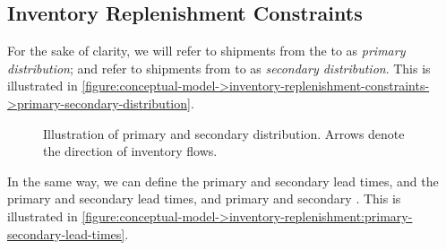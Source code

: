 \subsection{Inventory Replenishment Constraints}
\label{section:conceptual-model->inventory-replenishment-constraints}

For the sake of clarity,
we will refer to shipments
from the  to 
as \emph{primary distribution};
and refer to shipments
from  to 
as \emph{secondary distribution}.
This is illustrated in
\autoref{figure:conceptual-model->inventory-replenishment-constraints->primary-secondary-distribution}.

\begin{figure}[h!]
  \centering
  \def \myyshift {0mm}
  \tikzset{node distance=25mm}
  \centering
  \caption{Illustration of primary and secondary distribution.
    Arrows denote the direction of inventory flows.
  }
  \label{figure:conceptual-model->inventory-replenishment-constraints->primary-secondary-distribution}
\end{figure}



In the same way,
we can define the primary and secondary  lead times,
and the primary and secondary  lead times,
and primary and secondary .
This is illustrated in
\autoref{figure:conceptual-model->inventory-replenishment:primary-secondary-lead-times}.

